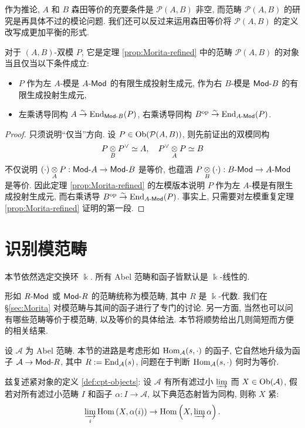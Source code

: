 作为推论, $A$ 和 $B$ 森田等价的充要条件是 $\mathcal{P}(A, B)$ 非空, 而范畴 $\mathcal{P}(A, B)$ 的研究是再具体不过的模论问题. 我们还可以反过来运用森田等价将 $\mathcal{P}(A, B)$ 的定义改写成更加平衡的形式.

\begin{corollary}\label{prop:Morita-refined-symm}
	对于 $(A, B)$-双模 $P$, 它是定理 \ref{prop:Morita-refined} 中的范畴 $\mathcal{P}(A, B)$ 的对象当且仅当以下条件成立:
	\begin{itemize}
		\item $P$ 作为左 $A$-模是 $A\text{-}\mathsf{Mod}$ 的有限生成投射生成元, 作为右 $B$-模是 $\mathsf{Mod}\text{-}B$ 的有限生成投射生成元,
		\item 左乘诱导同构 $A \stackrel{\sim}{\rightarrow} \operatorname{End}_{\mathsf{Mod}\text{-}B}(P)$, 右乘诱导同构 $B^{\operatorname{op}} \stackrel{\sim}{\rightarrow} \operatorname{End}_{A\text{-}\mathsf{Mod}}(P)$.
	\end{itemize}
\end{corollary}
\begin{proof}
	只须说明``仅当''方向. 设 $P \in \operatorname{Ob}(\mathcal{P}(A, B))$, 则先前证出的双模同构
	\[ P \underset{B}{\otimes} P^\vee \simeq A, \quad P^\vee \underset{A}{\otimes} P \simeq B \]
	不仅说明 $(\cdot) \underset{A}{\otimes} P: \mathsf{Mod}\text{-}A \to \mathsf{Mod}\text{-}B$ 是等价, 也蕴涵 $P \underset{B}{\otimes} (\cdot): B\text{-}\mathsf{Mod} \to A\text{-}\mathsf{Mod}$ 是等价. 因此定理 \ref{prop:Morita-refined} 的左模版本说明 $P$ 作为左 $A$-模是有限生成投射生成元, 而右乘诱导 $B^{\operatorname{op}} \stackrel{\sim}{\rightarrow} \operatorname{End}_{A\text{-}\mathsf{Mod}}(P)$. 事实上, 只需要对左模重复定理 \ref{prop:Morita-refined} 证明的第一段.
\end{proof}

\section{识别模范畴}\label{sec:module-cat}
本节依然选定交换环 $\Bbbk$. 所有 Abel 范畴和函子皆默认是 $\Bbbk$-线性的.

形如 $R\text{-}\mathsf{Mod}$ 或 $\mathsf{Mod}\text{-}R$ 的范畴统称为模范畴, 其中 $R$ 是 $\Bbbk$-代数. 我们在 \S\ref{sec:Morita} 对模范畴与其间的函子进行了专门的讨论. 另一方面, 当然也可以问有哪些范畴等价于模范畴, 以及等价的具体给法. 本节将顺势给出几则简短而方便的相关结果.

设 $\mathcal{A}$ 为 Abel 范畴. 本节的进路是考虑形如 $\operatorname{Hom}_{\mathcal{A}}(s, \cdot)$ 的函子, 它自然地升级为函子 $\mathcal{A} \to \mathsf{Mod}\text{-}R$, 其中 $R := \operatorname{End}_{\mathcal{A}}(s)$, 问题在于判断 $\operatorname{Hom}_{\mathcal{A}}(s, \cdot)$ 何时为等价.

兹复述紧对象的定义 \ref{def:cpt-objects}: 设 $\mathcal{A}$ 有所有滤过小 $\varinjlim$ 而 $X \in \operatorname{Ob}(\mathcal{A})$, 假若对所有滤过小范畴 $I$ 和函子 $\alpha: I \to \mathcal{A}$, 以下典范态射皆为同构, 则称 $X$ 紧:
\[ \varinjlim_i \operatorname{Hom}\left( X, \alpha(i) \right) \to \operatorname{Hom}\left( X, \varinjlim \alpha \right). \]

